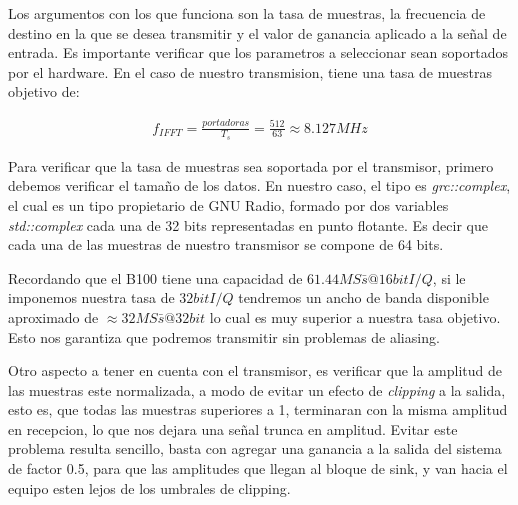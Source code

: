 Los argumentos con los que funciona son la tasa de muestras, la frecuencia de destino en la que se desea transmitir y el valor de ganancia aplicado a la señal de entrada. Es importante verificar que los parametros a seleccionar sean soportados por el hardware. En el caso de nuestro transmision, tiene una tasa de muestras objetivo de:

\begin{gather*}
	f_{IFFT} = \frac{portadoras}{T_{s}} = \frac{512}{63} \approx 8.127 MHz
\end{gather*}

Para verificar que la tasa de muestras sea soportada por el transmisor, primero debemos verificar el tamaño de los datos. En nuestro caso, el tipo es \textit{grc::complex}, el cual es un tipo propietario de GNU Radio, formado por dos variables \textit{std::complex} cada una de 32 bits representadas en punto flotante. Es decir que cada una de las muestras de nuestro transmisor se compone de 64 bits.

Recordando que el B100 tiene una capacidad de $61.44 MS\bar{s} @ 16 bit I/Q$, si le imponemos nuestra tasa de $32 bit I/Q$ tendremos un ancho de banda disponible aproximado de $\approx 32 MS\bar{s}@32 bit$ lo cual es muy superior a nuestra tasa objetivo. Esto nos garantiza que podremos transmitir sin problemas de aliasing.

Otro aspecto a tener en cuenta con el transmisor, es verificar que la amplitud de las muestras este normalizada, a modo de evitar un efecto de \textit{clipping} a la salida, esto es, que todas las muestras superiores a 1, terminaran con la misma amplitud en recepcion, lo que nos dejara una señal trunca en amplitud. Evitar este problema resulta sencillo, basta con agregar una ganancia a la salida del sistema de factor 0.5, para que las amplitudes que llegan al bloque de sink, y van hacia el equipo esten lejos de los umbrales de clipping.